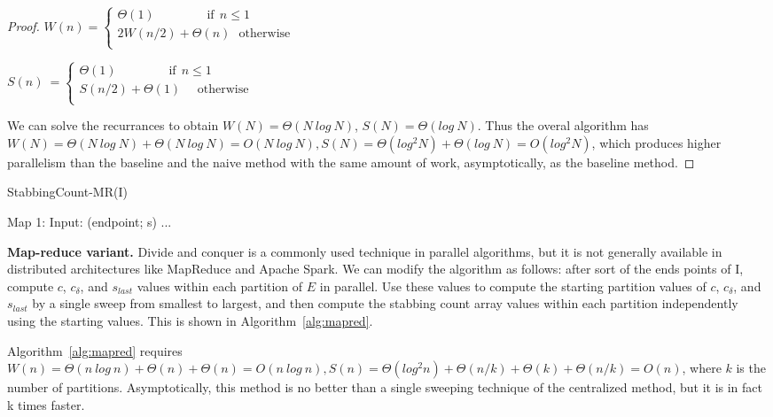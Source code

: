 \begin{proof}
$W(n) =
\begin{cases}
\Theta(1)~~~~~~~~~~~~~~~~~~~\text{if} ~~n \leq 1\\
2W(n/2) + \Theta(n) ~~~\text{otherwise}\\
\end{cases}$

$S(n) ~= 
\begin{cases}
\Theta(1)~~~~~~~~~~~~~~~~~~~\text{if} ~~n \leq 1\\
S(n/2) + \Theta(1) ~~~~~~\text{otherwise}\\
\end{cases}$

We can solve the recurrances to obtain $W(N) = \Theta(N~log~N)$, $S(N)
= \Theta(log~N)$.  Thus the overal algorithm has $W(N) =
\Theta(N~log~N) + \Theta(N~log~N) = O(N~log~N), S(N) = \Theta(log^2 N)
+ \Theta(log~N) = O(log^2 N)$, which produces higher parallelism than
the baseline and the naive method with the same amount of work,
asymptotically, as the baseline method.
\end{proof}

\begin{algorithm}
\caption{StabbingCount-MR(I)}
\begin{algorithmic}[1]
\State Map 1: Input: (endpoint; s)
\State ...
\end{algorithmic}
\label{alg:mapred}
\end{algorithm}

{\bf Map-reduce variant.}  Divide and conquer is a commonly used
technique in parallel algorithms, but it is not generally available in
distributed architectures like MapReduce and Apache Spark.  We can
modify the algorithm as follows: after sort of the ends points of I,
compute $c$, $c_\delta$, and $s_{last}$ values within each partition
of $E$ in parallel.  Use these values to compute the starting
partition values of $c$, $c_\delta$, and $s_{last}$ by a single sweep
from smallest to largest, and then compute the stabbing count array
values within each partition independently using the starting values.
This is shown in Algorithm~\ref{alg:mapred}.

Algorithm~\ref{alg:mapred} requires $W(n) = \Theta(n~log~n) +
\Theta(n) + \Theta(n) = O(n~log~n), S(n) = \Theta(log^2 n) +
\Theta(n/k) + \Theta(k) + \Theta(n/k) = O(n)$, where $k$ is the number
of partitions.  Asymptotically, this method is no better than a single
sweeping technique of the centralized method, but it is in fact k
times faster. 
